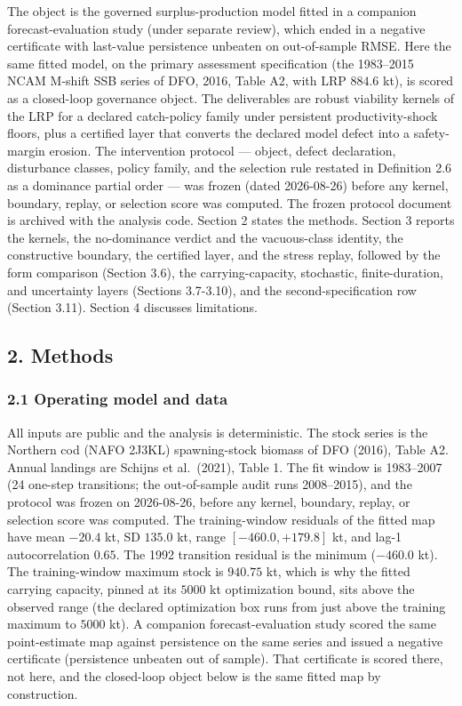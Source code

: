 \documentclass[11pt]{article}
\begin{document}
The object is the governed surplus-production model fitted in a
companion forecast-evaluation study (under separate review), which ended
in a negative certificate with last-value persistence unbeaten on
out-of-sample RMSE. Here the same fitted model, on the primary
assessment specification (the 1983--2015 NCAM M-shift SSB series of DFO,
2016, Table A2, with LRP \(884.6\) kt), is scored as a closed-loop
governance object. The deliverables are robust viability kernels of the
LRP for a declared catch-policy family under persistent
productivity-shock floors, plus a certified layer that converts the
declared model defect into a safety-margin erosion. The intervention
protocol --- object, defect declaration, disturbance classes, policy
family, and the selection rule restated in Definition 2.6 as a dominance
partial order --- was frozen (dated 2026-08-26) before any kernel,
boundary, replay, or selection score was computed. The frozen protocol
document is archived with the analysis code. Section 2 states the
methods. Section 3 reports the kernels, the no-dominance verdict and the
vacuous-class identity, the constructive boundary, the certified layer,
and the stress replay, followed by the form comparison (Section 3.6),
the carrying-capacity, stochastic, finite-duration, and uncertainty
layers (Sections 3.7-3.10), and the second-specification row (Section
3.11). Section 4 discusses limitations.

\subsection{2. Methods}\label{methods}

\subsubsection{2.1 Operating model and
data}\label{operating-model-and-data}

All inputs are public and the analysis is deterministic. The stock
series is the Northern cod (NAFO 2J3KL) spawning-stock biomass of DFO
(2016), Table A2. Annual landings are Schijns et al.~(2021), Table 1.
The fit window is 1983--2007 (24 one-step transitions; the out-of-sample
audit runs 2008--2015), and the protocol was frozen on 2026-08-26,
before any kernel, boundary, replay, or selection score was computed.
The training-window residuals of the fitted map have mean \(-20.4\) kt,
SD \(135.0\) kt, range \([-460.0, +179.8]\) kt, and lag-1
autocorrelation \(0.65\). The 1992 transition residual is the minimum
(\(-460.0\) kt). The training-window maximum stock is \(940.75\) kt,
which is why the fitted carrying capacity, pinned at its \(5000\) kt
optimization bound, sits above the observed range (the declared
optimization box runs from just above the training maximum to \(5000\)
kt). A companion forecast-evaluation study scored the same
point-estimate map against persistence on the same series and issued a
negative certificate (persistence unbeaten out of sample). That
certificate is scored there, not here, and the closed-loop object below
is the same fitted map by construction.
\end{document}
